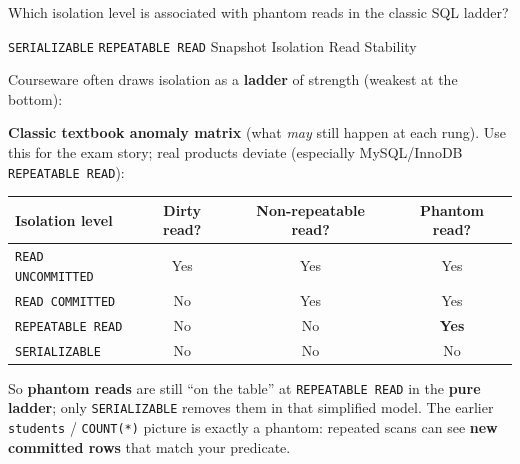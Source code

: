 \question[4]
Which isolation level is associated with phantom reads in the classic SQL ladder?
\begin{choices}
  \choice \texttt{SERIALIZABLE}
  \CorrectChoice \texttt{REPEATABLE READ}
  \choice Snapshot Isolation
  \choice Read Stability
\end{choices}
\begin{solution}
  Courseware often draws isolation as a \textbf{ladder} of strength (weakest at the bottom):

  \begin{center}
  \footnotesize
  \end{center}

  \noindent\textbf{Classic textbook anomaly matrix} (what \emph{may} still happen at each rung). Use this for the exam story; real products deviate (especially MySQL/InnoDB \texttt{REPEATABLE READ}):

  \begin{center}
  \footnotesize
  \renewcommand{\arraystretch}{1.2}
  \begin{tabular}{|l|c|c|c|}
    \hline
    \textbf{Isolation level} & \textbf{Dirty read?} & \textbf{Non-repeatable read?} & \textbf{Phantom read?} \\
    \hline
    \texttt{READ UNCOMMITTED}  & Yes & Yes & Yes \\
    \texttt{READ COMMITTED}    & No  & Yes & Yes \\
    \texttt{REPEATABLE READ}   & No  & No  & \textbf{Yes} \\
    \texttt{SERIALIZABLE}      & No  & No  & No \\
    \hline
  \end{tabular}
  \renewcommand{\arraystretch}{1}
  \end{center}

  \noindent So \textbf{phantom reads} are still ``on the table'' at \texttt{REPEATABLE READ} in the \textbf{pure ladder}; only \texttt{SERIALIZABLE} removes them in that simplified model. The earlier \texttt{students} / \texttt{COUNT(*)} picture is exactly a phantom: repeated scans can see \textbf{new committed rows} that match your predicate.
\end{solution}


